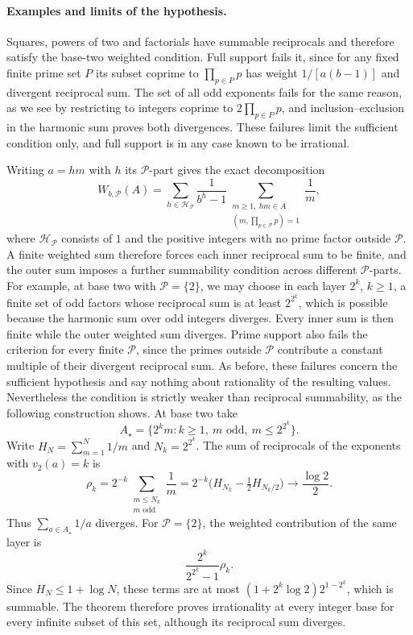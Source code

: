 \paragraph{Examples and limits of the hypothesis.}
Squares, powers of two and factorials have summable reciprocals and
therefore satisfy the base-two weighted condition. Full support fails it,
since for any fixed finite prime set $P$ its subset coprime to
$\prod_{p\in P}p$ has weight $1/[a(b-1)]$ and divergent reciprocal sum.
The set of all odd exponents fails for the same reason, as we see by
restricting to integers coprime to $2\prod_{p\in P}p$, and
inclusion--exclusion in the harmonic sum proves both divergences. These
failures limit the sufficient condition only, and full support is in any
case known to be irrational.

Writing $a=hm$ with $h$ its $\mathcal P$-part gives the exact decomposition
\[
 W_{b,\mathcal P}(A)=\sum_{h\in\mathcal H_{\mathcal P}}\frac1{b^h-1}
       \sum_{\substack{m\ge1,\ hm\in A\\(m,\prod_{p\in\mathcal P}p)=1}}\frac1m,
\]
where $\mathcal H_{\mathcal P}$ consists of $1$ and the positive
integers with no prime factor outside $\mathcal P$. A finite weighted
sum therefore forces each inner reciprocal sum to be finite, and the
outer sum imposes a further summability condition across different
$\mathcal P$-parts. For example, at base two with $\mathcal P=\{2\}$, we
may choose in each layer $2^k$, $k\ge1$, a finite set of odd factors whose
reciprocal sum is at least $2^{2^k}$, which is possible because the
harmonic sum over odd integers diverges. Every inner sum is then finite
while the outer weighted sum diverges. Prime support also fails the
criterion for every finite $\mathcal P$, since the primes outside
$\mathcal P$ contribute a constant multiple of their divergent
reciprocal sum. As before, these failures concern the sufficient
hypothesis and say nothing about rationality of the resulting values.
Nevertheless the condition is strictly weaker than reciprocal
summability, as the following construction shows.
At base two take
\[
 A_\star=\{2^k m:k\ge1,\ m\text{ odd},\ m\le2^{2^k}\}.
\]
Write $H_N=\sum_{m=1}^N1/m$ and $N_k=2^{2^k}$. The sum of reciprocals
of the exponents with $v_2(a)=k$ is
\[
 \rho_k=2^{-k}\!\sum_{\substack{m\le N_k\\m\text{ odd}}}\frac1m
 =2^{-k}\bigl(H_{N_k}-\tfrac12H_{N_k/2}\bigr)
 \longrightarrow\frac{\log2}{2}.
\]
Thus $\sum_{a\in A_\star}1/a$ diverges.  For $\mathcal P=\{2\}$,
the weighted contribution of the same layer is
\[
 \frac{2^k}{2^{2^k}-1}\rho_k.
\]
Since $H_N\le1+\log N$, these terms are at most
$(1+2^k\log2)2^{1-2^k}$, which is summable.  The theorem therefore proves
irrationality at every integer base for every infinite subset of this set,
although its reciprocal sum diverges.



